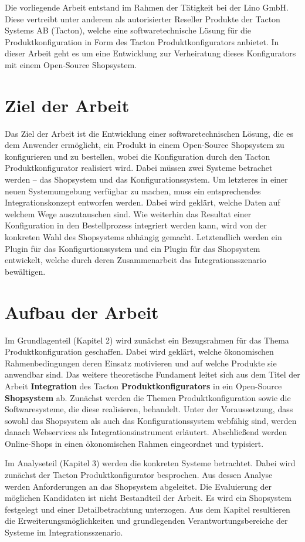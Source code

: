 \documentclass[11pt, a4paper, titlepage, listof=totoc, bibliography=totoc, index=totoc, twoside, openright, headings=normal]{scrreprt}
\begin{document}
Die vorliegende Arbeit entstand im Rahmen der Tätigkeit bei der Lino GmbH. Diese vertreibt unter anderem als autorisierter Reseller Produkte der Tacton Systems AB (Tacton), welche eine softwaretechnische Lösung für die Produktkonfiguration in Form des Tacton Produktkonfigurators anbietet. In dieser Arbeit geht es um eine Entwicklung zur Verheiratung dieses Konfigurators mit einem Open-Source Shopsystem.

\section{Ziel der Arbeit}
Das Ziel der Arbeit ist die Entwicklung einer softwaretechnischen Lösung, die es dem Anwender ermöglicht, ein Produkt in einem Open-Source Shopsystem zu konfigurieren und zu bestellen, wobei die Konfiguration durch den Tacton Produktkonfigurator realisiert wird. Dabei müssen zwei Systeme betrachet werden -- das Shopsystem und das Konfigurationssystem. Um letzteres in einer neuen Systemumgebung verfügbar zu machen, muss ein entsprechendes Integrationskonzept entworfen werden. Dabei wird geklärt, welche Daten auf welchem Wege auszutauschen sind. Wie weiterhin das Resultat einer Konfiguration in den Bestellprozess integriert werden kann, wird von der konkreten Wahl des Shopsystems abhängig gemacht. Letztendlich werden ein Plugin für das Konfigurtionssystem und ein Plugin für das Shopsystem entwickelt, welche durch deren Zusammenarbeit das Integrationsszenario bewältigen.

\section{Aufbau der Arbeit}
Im Grundlagenteil (Kapitel 2) wird zunächst ein Bezugsrahmen für das Thema Produktkonfiguration geschaffen. Dabei wird geklärt, welche ökonomischen Rahmenbedingungen deren Einsatz motivieren und auf welche Produkte sie anwendbar sind. Das weitere theoretische Fundament leitet sich aus dem Titel der Arbeit \glqq \textbf{Integration} des Tacton \textbf{Produktkonfigurators} in ein Open-Source \textbf{Shopsystem}\grqq{} ab. Zunächst werden die Themen Produktkonfiguration sowie die Softwaresysteme, die diese realisieren, behandelt. Unter der Voraussetzung, dass sowohl das Shopsystem als auch das Konfigurationssystem webfähig sind, werden danach Webservices als Integrationsinstrument erläutert. Abschließend werden Online-Shops in einen ökonomischen Rahmen eingeordnet und typisiert. 

Im Analyseteil (Kapitel 3) werden die konkreten Systeme betrachtet. Dabei wird zunächst der Tacton Produktkonfigurator besprochen. Aus dessen Analyse werden Anforderungen an das Shopsystem abgeleitet. Die Evaluierung der möglichen Kandidaten ist nicht Bestandteil der Arbeit. Es wird ein Shopsystem festgelegt und einer Detailbetrachtung unterzogen. Aus dem Kapitel resultieren die Erweiterungsmöglichkeiten und grundlegenden Verantwortungsbereiche der Systeme im Integrationsszenario.
\end{document}
